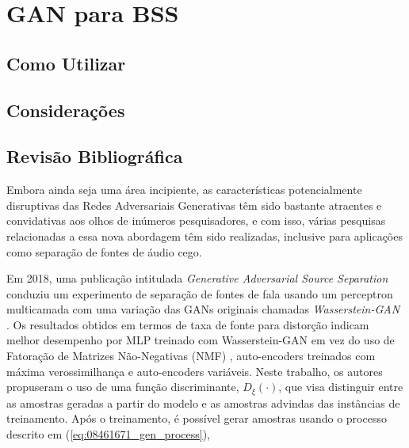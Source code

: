 \chapter{GAN para BSS}
\label{cha:gan_for_bss}





\section{Como Utilizar}
\label{sec:gan_for_bss_how_to_use}



\section{Considerações}
\label{sec:sec:gan_for_bss_considerations}



\section{Revisão Bibliográfica}
\label{sec:gan_for_bss_bib_review}

Embora ainda seja uma área incipiente, as características potencialmente disruptivas das Redes Adversariais Generativas têm sido bastante atraentes e convidativas aos olhos de inúmeros pesquisadores, e com isso, várias pesquisas relacionadas a essa nova abordagem têm sido realizadas, inclusive para aplicações como separação de fontes de áudio cego.

Em 2018, uma publicação intitulada \textit{Generative Adversarial Source Separation} \citep{8461671} conduziu um experimento de separação de fontes de fala usando um perceptron multicamada com uma variação das GANs originais chamadas \textit{Wasserstein-GAN} \citep{arjovsky2017wasserstein}. Os resultados obtidos em termos de taxa de fonte para distorção indicam melhor desempenho por MLP treinado com Wasserstein-GAN em vez do uso de Fatoração de Matrizes Não-Negativas (NMF) \citep{lee1999learning}, auto-encoders treinados com máxima verossimilhança e auto-encoders variáveis. Neste trabalho, os autores propuseram o uso de uma função discriminante, $D_{\xi}\left(\cdot\right)$, que visa distinguir entre as amostras geradas a partir do modelo e as amostras advindas das instâncias de treinamento. Após o treinamento, é possível gerar amostras usando o processo descrito em (\ref{eq:08461671_gen_process}),

